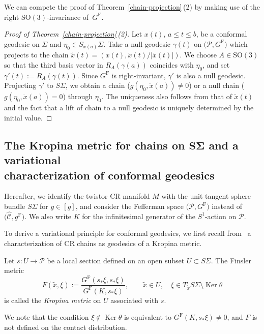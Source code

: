 \documentclass[pdftex]{sigma}
\renewcommand\th{\theta}
\newcommand{\wh}{\widehat}
\numberwithin{equation}{section}
\begin{document}
We can compete the proof of Theorem~\ref{chain-projection}\,(2) by making use of the right $\mathrm{SO}(3)$-invariance of~$G^{\mathrm{F}}$.

\begin{proof}[Proof of Theorem~\ref{chain-projection}\,(2)]
Let $x(t)$, $a\le t\le b$, be a conformal geodesic on $\Sigma$ and $\eta_0\in S_{x(a)}\Sigma$. Take a null geodesic $\gamma(t)$ on $\bigl(\mathcal{P}, G^{\mathrm{F}}\bigr)$ which projects to the chain $\tilde x(t)=(x(t), \dot x(t)/|\dot x(t)|)$.
We choose $A\in \mathrm{SO}(3)$ so that the third basis vector in $R_A(\gamma(a))$ coincides with $\eta_0$, and set $\gamma'(t):=R_A(\gamma(t))$. Since $G^{\mathrm{F}}$ is right-invariant, $\gamma'$ is also a null geodesic. Projecting $\gamma'$ to $S\Sigma$, we obtain a chain ($g(\eta_0, \dot x(a))\neq0$) or a null chain
 ($g(\eta_0, \dot x(a))=0$) through $\eta_0$. The uniqueness also follows from that of $\tilde x(t)$ and the fact that a lift of chain to a null geodesic is uniquely determined by the initial value.
\end{proof}

\subsection[The Kropina metric for chains on S Sigma and a variational characterization of conformal geodesics]{The Kropina metric for chains on $\boldsymbol{S\Sigma}$ and a variational \\ characterization of conformal geodesics}\label{Kropina}

Hereafter, we identify the twistor CR manifold $M$ with the unit tangent sphere bundle $S\Sigma$ for $g\in[g]$, and consider the Fefferman space $\bigl(\mathcal{P}, G^{\mathrm{F}}\bigr)$ instead of $\bigl(\wh{\mathcal{C}}, g^{\mathrm{F}}\bigr)$. We also write $K$ for the infinitesimal generator of the $S^1$-action on $\mathcal{P}$.

To derive a variational principle for conformal geodesics, we first recall from~\cite{CMMM} a characterization of CR chains as geodesics of a Kropina metric.
\begin{Definition}
Let $s\colon U\to\mathcal{P}$ be a local section defined on an open subset $U\subset S\Sigma$. The Finsler metric
\[
F(\tilde x, \xi):=\frac{G^{\mathrm{F}}(s_* \xi, s_*\xi)}{G^{\mathrm{F}}(K, s_*\xi)}, \qquad \tilde x\in U,\quad \xi\in T_{\tilde x}S\Sigma\setminus\operatorname{Ker}\th
\]
is called the {\it Kropina metric} on $U$ associated with $s$.
\end{Definition}
We note that the condition $\xi\notin\operatorname{Ker}\th$ is equivalent to $G^{\mathrm{F}}(K, s_*\xi)\neq0$, and $F$ is not defined on the contact distribution.
\end{document}
